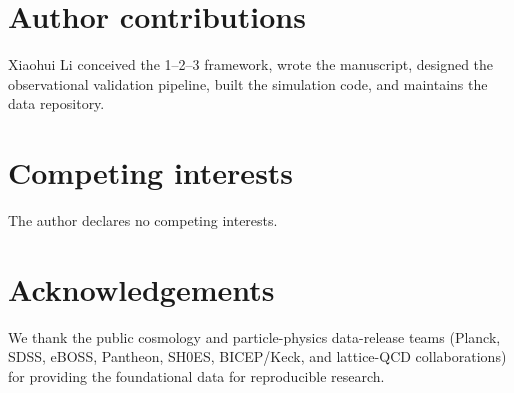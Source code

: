 \documentclass[11pt,a4paper]{article}
\begin{document}
\section*{Author contributions}
Xiaohui Li conceived the 1--2--3 framework, wrote the manuscript, designed the observational validation pipeline, built the simulation code, and maintains the data repository.

\section*{Competing interests}
The author declares no competing interests.

\section*{Acknowledgements}
We thank the public cosmology and particle-physics data-release teams (Planck, SDSS, eBOSS, Pantheon, SH0ES, BICEP/Keck, and lattice-QCD collaborations) for providing the foundational data for reproducible research.
\end{document}

